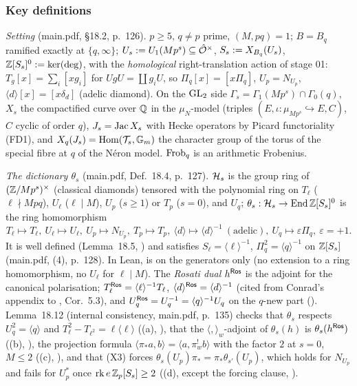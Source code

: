 \subsubsection*{Key definitions}
\emph{Setting} (main.pdf, \S18.2, p.~126). $p\ge5$, $q\ne p$ prime, $(M,pq)=1$; $B=B_q$ ramified exactly at $\{q,\infty\}$;
$U_s:=U_1(Mp^s)\subseteq\hat{\mathcal{O}}^\times$, $S_s:=X_{B_q}(U_s)$, $\mathbb{Z}[S_s]^0:=\ker(\deg)$, with the \emph{homological} right-translation
action of stage 01: $T_g[x]=\sum_i[xg_i]$ for $UgU=\coprod g_iU$, so $\Pi_q[x]=[x\Pi_q]$, $U_p=N_{U_p}$, $\langle d\rangle[x]=[x\delta_d]$
(adelic diamond). On the $\mathrm{GL}_2$ side $\Gamma_s=\Gamma_1(Mp^s)\cap\Gamma_0(q)$, $X_s$ the compactified curve over $\mathbb{Q}$ in the
$\mu_N$-model (triples $(E,\iota:\mu_{Mp^s}\hookrightarrow E,C)$, $C$ cyclic of order $q$), $J_s=\operatorname{Jac} X_s$ with Hecke operators by
Picard functoriality (FD1), and $X_q(J_s)=\operatorname{Hom}(\mathcal T_s,\mathbb G_m)$ the character group of the torus of the special fibre at
$q$ of the Néron model. $\mathrm{Frob}_q$ is an arithmetic Frobenius.

\emph{The dictionary $\theta_s$} (main.pdf, Def.~18.4, p.~127). $\mathcal{H}_s$ is the group ring of $(\mathbb{Z}/Mp^s)^\times$ (classical diamonds)
tensored with the polynomial ring on $T_\ell$ ($\ell\nmid Mpq$), $U_\ell$ ($\ell\mid M$), $U_p$ ($s\ge1$) or $T_p$ ($s=0$), and $U_q$;
$\theta_s:\mathcal{H}_s\to\operatorname{End}\mathbb{Z}[S_s]^0$ is the ring homomorphism
\[T_\ell\mapsto T_\ell,\ U_\ell\mapsto U_\ell,\ U_p\mapsto N_{U_p},\ T_p\mapsto T_p,\ \langle d\rangle\mapsto\langle d\rangle^{-1}\ (\text{adelic}),\
U_q\mapsto\varepsilon\Pi_q,\ \varepsilon=+1.\]
It is well defined (Lemma~18.5, \stproved) and satisfies $S_\ell=\langle\ell\rangle^{-1}$, $\Pi_q^2=\langle q\rangle^{-1}$ on $\mathbb{Z}[S_s]$ (main.pdf,
(4), p.~128). In Lean, \pathtt{Langlandscape.Comparison.theta} is \stformal{} on the generators only (no extension to a ring
homomorphism, no $U_\ell$ for $\ell\mid M$). The \emph{Rosati dual} $h^{\mathsf{Ros}}$ is the adjoint for the canonical polarisation;
$T_\ell^{\mathsf{Ros}}=\langle\ell\rangle^{-1}T_\ell$, $\langle d\rangle^{\mathsf{Ros}}=\langle d\rangle^{-1}$ (cited from Conrad's appendix to \cite{RS}, Cor.~5.3),
and $U_q^{\mathsf{Ros}}=U_q^{-1}=\langle q\rangle^{-1}U_q$ on the $q$-new part (\stpmc). Lemma~18.12 (internal consistency, main.pdf, p.~135) checks
that $\theta_s$ respects $U_q^2=\langle q\rangle$ and $T_\ell^2-T_{\ell^2}=\ell\langle\ell\rangle$ ((a), \stproved), that the
$\langle,\rangle_w$-adjoint of $\theta_s(h)$ is $\theta_s(h^{\mathsf{Ros}})$ ((b), \stpmc), the projection formula $\langle\pi_*a,b\rangle=\langle a,\pi^!_wb\rangle$
with the factor $2$ at $s=0$, $M\le2$ ((c), \stproved), and that (X3) forces $\theta_s(U_p)\pi_*=\pi_*\theta_{s'}(U_p)$, which holds for
$N_{U_p}$ and fails for $U_p^*$ once $\operatorname{rk} e\,\mathbb{Z}_p[S_s]\ge2$ ((d), \stproved{} except the forcing clause, \stpmc).

